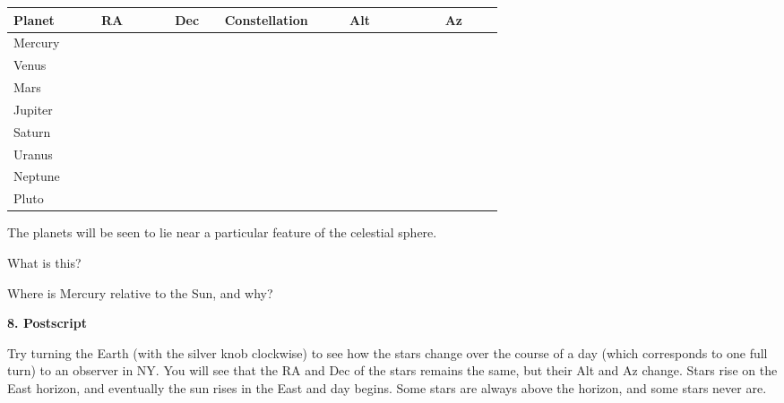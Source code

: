 \medskip
\begin{center}
\begin{tabular}{lccccc} \hline
Planet  & \ \ \ \ RA  \ \ \ & \hspace{1.5cm} Dec \hspace{1.5cm} &
         Constellation &\ \ \ \  Alt \ \ \ \ & \ \ \ \  Az\ \ \  \ \\ 
         \hline
Mercury   & ~~~~~~~~ & ~~~~~~~~ & & &       \\ \hline
Venus     & & &     & &    \\ \hline
Mars      & & &     & &    \\ \hline
Jupiter   & & &   & &      \\ \hline
Saturn    & & &   & &      \\  \hline
Uranus    & & &    & &   \\  \hline 
Neptune   & & &   & &    \\  \hline 
Pluto     & & &   & &    \\  \hline 
\end{tabular}
\end{center}

\noindent The planets will be seen to lie near a particular feature of the
celestial sphere. 

\noindent What is this? \makebox[4cm]{\hrulefill}

\noindent Where is Mercury relative to the Sun, and why?

\bigskip
\bigskip
\bigskip

\noindent 
{\bf 8. Postscript}

\bigskip\noindent
Try turning the Earth (with the silver knob clockwise) to see how the
stars change over the course of a day (which corresponds to one full
turn) to an observer in NY.  You will see that the RA and Dec of the
stars remains the same, but their Alt and Az change. Stars rise on the
East horizon, and eventually the sun rises in the East and day
begins. Some stars are always above the horizon, and some stars never
are.


